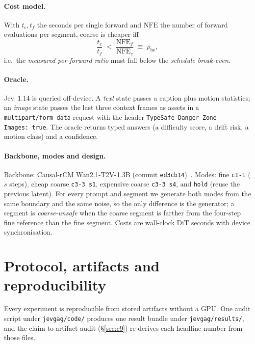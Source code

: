 \documentclass[journal]{IEEEtran}
\begin{document}
\paragraph{Cost model.}
With $t_c,t_f$ the seconds per single forward and $\mathrm{NFE}$ the number of forward evaluations per
segment, coarse is cheaper iff
\begin{equation}
\frac{t_c}{t_f} \;<\; \frac{\mathrm{NFE}_f}{\mathrm{NFE}_c} \;\equiv\; \rho_{\text{be}},
\label{eq:be}
\end{equation}
i.e.\ the \emph{measured per-forward ratio} must fall below the \emph{schedule break-even}.

\paragraph{Oracle.}
Jev~1.14 is queried off-device. A \emph{text} state passes a caption plus motion statistics; an
\emph{image} state passes the last three context frames as assets in a \texttt{multipart/form-data}
request with the header \texttt{TypeSafe-Danger-Zone-Images:~true}. The oracle returns typed answers
(a difficulty score, a drift risk, a motion class) and a confidence.

\paragraph{Backbone, modes and design.}
Backbone: Causal-rCM Wan2.1-T2V-1.3B (commit \texttt{ed3cb14})~\cite{zheng2026causalrcm}. Modes: fine
\texttt{c1-1} ($s$ steps), cheap coarse \texttt{c3-3 s1}, expensive coarse \texttt{c3-3 s4}, and
\texttt{hold} (reuse the previous latent). For every prompt and segment we generate both modes from the
same boundary and the same noise, so the only difference is the generator; a segment is
\emph{coarse-unsafe} when the coarse segment is farther from the four-step fine reference than the fine
segment. Costs are wall-clock DiT seconds with device synchronisation.

\section{Protocol, artifacts and reproducibility}
\label{sec:protocol}
Every experiment is reproducible from stored artifacts without a GPU. One audit script under
\texttt{jevgag/code/} produces one result bundle under \texttt{jevgag/results/}, and the claim-to-artifact
audit (\S\ref{sec:e9}) re-derives each headline number from those files.
\end{document}
